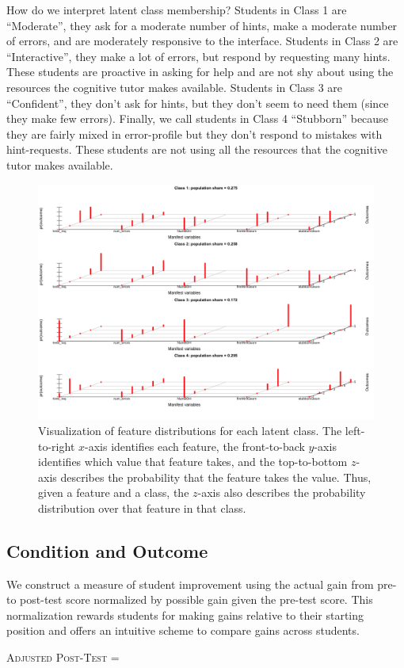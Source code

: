 \documentclass{edm_template}
\begin{document}
How do we interpret latent class membership? Students in Class 1 are ``Moderate'', they ask for a moderate number of hints, make a moderate number of errors, and are moderately responsive to the interface. Students in Class 2 are ``Interactive'', they make a lot of errors, but respond by requesting many hints. These students are proactive in asking for help and are not shy about using the resources the cognitive tutor makes available. Students in Class 3 are ``Confident'', they don't ask for hints, but they don't seem to need them (since they make few errors). Finally, we call students in Class 4 ``Stubborn'' because they are fairly mixed in error-profile but they don't respond to mistakes with hint-requests. These students are not using all the resources that the cognitive tutor makes available.

\begin{figure}[htbp]
\centering
\includegraphics[scale=0.5]{lca-class-viz.png}
\caption{Visualization of feature distributions for each latent class. The left-to-right $x$-axis identifies each feature, the front-to-back $y$-axis identifies which value that feature takes, and the top-to-bottom $z$-axis describes the probability that the feature takes the value. Thus, given a feature and a class, the $z$-axis also describes the probability distribution over that feature in that class.}
\label{fig:lca-class-viz}
\end{figure}


\subsection{Condition and Outcome} 
We construct a measure of student improvement using the actual gain from pre- to post-test score normalized by possible gain given the pre-test score. This normalization rewards students for making gains relative to their starting position and offers an intuitive scheme to compare gains across students.
\begin{center}
\textsc{Adjusted Post-Test} = 
\end{center}
\end{document}
